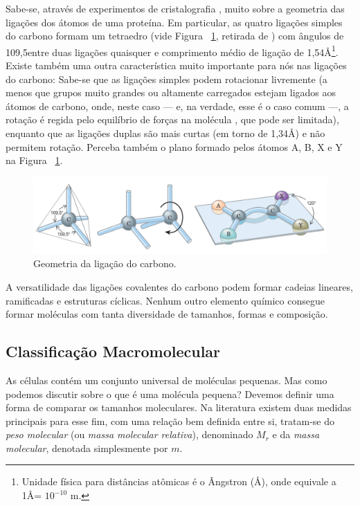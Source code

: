\documentclass[a4paper,12pt]{article}
\begin{document}
	Sabe-se, através de experimentos de cristalografia \cite{ramachandran1974MolStructure}, muito sobre a geometria das ligações dos átomos de uma proteína. Em particular, as quatro ligações simples do carbono formam um tetraedro (vide Figura ~\ref{fig:carbono}, retirada de \cite{bioquimicaLehninger}) com ângulos de 109,5\textdegree entre duas ligações quaisquer e comprimento médio de ligação de 1,54\AA\footnote[1]{Unidade física para distâncias atômicas é o Ângstron (\AA), onde equivale a 1\AA = $10^{-10}$ m.}. Existe também uma outra característica muito importante para nós nas ligações do carbono: Sabe-se que as ligações simples podem rotacionar livremente (a menos que grupos muito grandes ou altamente carregados estejam ligados aos átomos de carbono, onde, neste caso --- e, na verdade, esse é o caso comum ---, a rotação é regida pelo equilíbrio de forças na molécula \cite{carlileTese}, que pode ser limitada), enquanto que as ligações duplas são mais curtas (em torno de 1,34\AA) e não permitem rotação. Perceba também o plano formado pelos átomos A, B, X e Y na Figura ~\ref{fig:carbono}.

	\begin{figure}[H]
		\begin{center}
			\includegraphics[width=1\linewidth]{carbono.png}
		\end{center}
		\caption{Geometria da ligação do carbono.}
		\label{fig:carbono}
	\end{figure}

	A versatilidade das ligações covalentes do carbono podem formar cadeias lineares, ramificadas e estruturas cíclicas. Nenhum outro elemento químico consegue formar moléculas com tanta diversidade de tamanhos, formas e composição.
	
	\subsection{Classificação Macromolecular}
	As células contém um conjunto universal de moléculas pequenas. Mas como podemos discutir sobre o que é uma molécula pequena? Devemos definir uma forma de comparar os tamanhos moleculares. Na literatura existem duas medidas principais para esse fim, com uma relação bem definida entre si, tratam-se do \textit{peso molecular} (ou \textit{massa molecular relativa}), denominado $M_r$ e da \textit{massa molecular}, denotada simplesmente por $m$.
	
\end{document}
